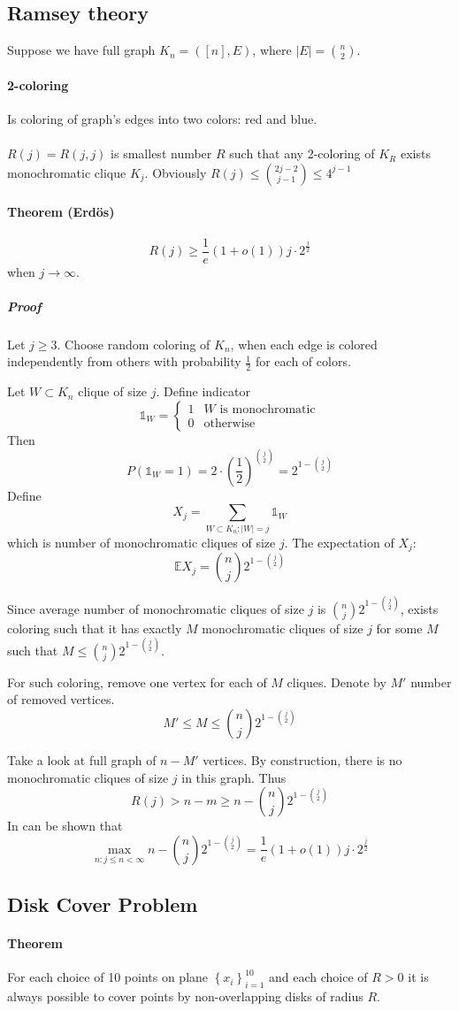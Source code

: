  \subsection{Ramsey theory}
 Suppose we have full graph
 $K_n = \left(\left[ n \right], E \right)$, where $|E| = \binom{n}{2}$.
 \paragraph{2-coloring}
 Is coloring of graph's edges into two colors: red and blue.
 \paragraph{}
 $R(j) = R(j,j)$ is smallest number $R$ such that any 2-coloring of $K_R$ exists monochromatic clique $K_j$. Obviously $R(j) \leq \binom{2j-2}{j-1}\leq 4^{j-1}$
 \paragraph{Theorem (Erd\"{o}s)}
 $$R(j) \geq \frac{1}{e} \left( 1+o(1) \right) j \cdot 2^{\frac{j}{2}}$$ when $j \to \infty$.
 \subparagraph{Proof}
 Let $j \geq 3$. Choose random coloring of $K_n$, when each edge is colored independently from others with probability $\frac{1}{2}$ for each of colors.
 
 Let $W \subset K_n$ clique of size $j$. Define indicator 
 $$\mathds{1}_W = \begin{cases}
 1& W \text{ is monochromatic}\\
 0 & \text{otherwise}
 \end{cases} $$
 Then
 $$P\left(\mathds{1}_W = 1\right) = 2 \cdot \left( \frac{1}{2} \right)^{\binom{j}{2}} = 2^{1-\binom{j}{2}}$$
 Define
 $$X_j = \sum_{W\subset K_n: |W| = j} \mathds{1}_W$$
 which is number of monochromatic cliques of size $j$. The expectation of $X_j$:
 $$\mathbb{E} X_j = \binom{n}{j} 2^{1-\binom{j}{2}}$$
 
 Since average number of monochromatic cliques of size $j$ is $\binom{n}{j} 2^{1-\binom{j}{2}}$, exists coloring such that it has exactly $M$  monochromatic cliques of size $j$ for some $M$ such that $M \leq \binom{n}{j} 2^{1-\binom{j}{2}}$.
 
 For such coloring, remove one vertex for each of $M$ cliques. Denote by $M'$ number of removed vertices. $$M' \leq M \leq  \binom{n}{j} 2^{1-\binom{j}{2}}$$
 
 Take a look at full graph of $n-M'$ vertices. By construction, there is no monochromatic cliques of size $j$ in this graph. Thus
 $$R(j) > n-m \geq n - \binom{n}{j} 2^{1-\binom{j}{2}}$$
 In can be shown that
 $$\max \limits_{n: j \leq n < \infty} n - \binom{n}{j} 2^{1-\binom{j}{2}} = \frac{1}{e} \left( 1+o(1) \right) j \cdot 2^{\frac{j}{2}}$$
 \subsection{Disk Cover Problem}
 \paragraph{Theorem} For each choice of 10 points on plane $\left\{ x_i \right\}_{i=1}^{10}$ and each choice of $R>0$ it is always possible to cover points by non-overlapping disks of radius $R$. 
